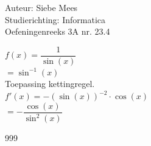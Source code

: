 \documentclass[a4paper]{article}
\begin{document}
  
\noindent \large Auteur: Siebe Mees \\
\noindent \large Studierichting: Informatica\\
\noindent \large Oefeningenreeks 3A nr. 23.4\\

\medskip

\normalsize

$ f(x) = \dfrac{1}{\sin(x)} $ \\

$ = \sin^{-1}(x) $ \\

Toepassing kettingregel. \\

$ f'(x) = - (\sin(x))^{-2} \cdot \cos(x)  $ \\

$  = -\dfrac{\cos(x)}{\sin^2(x)}$ \\

\begin{thebibliography}{999}
\end{thebibliography}
\end{document}
